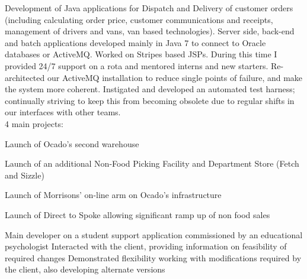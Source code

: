\documentclass[freya.tex]{subfiles}
\begin{document}
Development of Java applications for Dispatch and Delivery of customer orders (including calculating order price, customer communications and receipts, management of drivers and vans, van based technologies).  Server side, back-end and batch applications developed mainly in Java 7 to connect to Oracle databases or ActiveMQ.  Worked on Stripes based JSPs.  During this time I provided 24/7 support on a rota and mentored interns and new starters.  Re-architected our ActiveMQ installation to reduce single points of failure, and make the system more coherent.  Instigated and developed an automated test harness; continually striving to keep this from becoming obsolete due to regular shifts in our interfaces with other teams.\\


\vspace{5pt}
4 main projects:
\begin{tightemize}
\vspace{5pt}
\item  Launch of Ocado's second warehouse 
 \item Launch of an additional Non-Food Picking Facility and Department Store (Fetch and Sizzle)
 \item Launch of Morrisons' on-line arm on Ocado's infrastructure
 \item Launch of Direct to Spoke allowing significant ramp up of non food sales
 \end{tightemize}
 
\begin{verbose}
\sectionsep
{}
Main developer on a student support application commissioned by an educational psychologist
Interacted with the client, providing information on feasibility of required changes
Demonstrated flexibility working with modifications required by the client, also developing alternate versions\\
\end{verbose}
\end{document}
